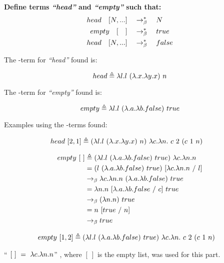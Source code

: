 \documentclass{article}
\begin{document}
	\begin{Large}
		\textbf{Define terms \textit{``head''} and \textit{``empty''} such that:}
			\begin{align*}
				head \quad [ N, ...] &\quad \rightarrow_\beta^*\quad  N\\
				empty \quad [\quad] &\quad \rightarrow_\beta^*\quad true\\
				head \quad [ N, ...] &\quad \rightarrow_\beta^*\quad false
			\end{align*}
		
		The \lamb -term for \textit{``head''} found is:
		\begin{LARGE}
			\begin{equation*}
				head \triangleq \lambda l.l \ (\lambda .x.\lambda y.x) \ n
			\end{equation*}
		\end{LARGE}
		
		The \lamb -term for \textit{``empty''} found is:
		\begin{LARGE}
			\begin{equation*}
				empty \triangleq \lambda l.l \ (\lambda .a.\lambda b.false) \ true
			\end{equation*}
		\end{LARGE}
		
		Examples using the \lamb -terms found:
		
		\begin{align*}
			head \ [2,1] &\triangleq (\la l.l \ (\la .x.\la y.x) \ n) \ \la c.\la n. \ c \ 2 \ (c \ 1 \ n)
		\end{align*}
		
		\begin{align*}
			empty \ [ \ ] &\triangleq (\la l.l \ (\la .a.\la b.false) \ true) \ \la c.\la n.n \\
			&= (l \ (\la .a.\la b.false) \ true) \ [\la c.\la n.n \ / \ l] \\
			&\equals \la c.\la n.n \ (\la .a.\la b.false) \ true \\
			&= \la n.n \ [\la .a.\la b.false \ / \ c] \ true \\
			&\equals (\la n.n) \ true \\
			&= n \ [true \ / \ n] \\
			&\equals true
		\end{align*}
		
		\begin{align*}
			empty \ [1,2] &\triangleq (\lambda l.l \ (\lambda .a.\lambda b.false) \ true) \ \lambda c.\lambda n. \ c \ 2 \ (c \ 1 \ n)
		\end{align*}
		
		``$ \ [ \ ] \ = \ \lambda c.\lambda n.n$'' , where $[ \ ]$ is the empty list, was used for this part.
		
	\end{Large}
	\newpage
\end{document}
